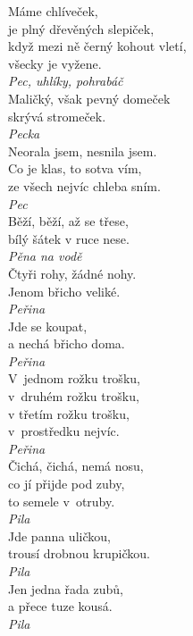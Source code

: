 \begin{multicols}{4}
\noindent
Máme chlíveček,\\
je plný dřevěných slepiček,\\
když mezi ně černý kohout vletí,\\
všecky je vyžene.\\[1 mm]
{\sl Pec, uhlíky, pohrabáč}\\

\noindent
Maličký, však pevný domeček\\
skrývá stromeček.\\[1 mm]
{\sl Pecka}\\

\noindent
Neorala jsem, nesnila jsem.\\
Co je klas, to sotva vím,\\
ze všech nejvíc chleba sním.\\[1 mm]
{\sl Pec}\\

\noindent
Běží, běží, až se třese,\\
bílý šátek v ruce nese.\\[1 mm]
{\sl Pěna na vodě}\\

\noindent
Čtyři rohy, žádné nohy.\\
Jenom břicho veliké.\\[1 mm]
{\sl Peřina}\\

\noindent
Jde se koupat,\\
a nechá břicho doma.\\[1 mm]
{\sl Peřina}\\

\noindent
V~jednom rožku trošku,\\
v~druhém rožku trošku,\\
v třetím rožku trošku,\\
v~prostředku nejvíc.\\[1 mm]
{\sl Peřina}\\

\noindent
Čichá, čichá, nemá nosu,\\
co jí přijde pod zuby,\\
to semele v~otruby.\\[1 mm]
{\sl Pila}\\

\noindent
Jde panna uličkou,\\
trousí drobnou krupičkou.\\[1 mm]
{\sl Pila}\\

\noindent
Jen jedna řada zubů,\\
a přece tuze kousá.\\[1 mm]
{\sl Pila}\\


\end{multicols}
